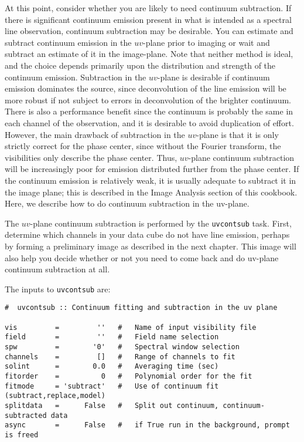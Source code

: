 At this point, consider whether you are likely to need continuum
subtraction.  If there is significant continuum emission present in
what is intended as a spectral line observation, continuum subtraction
may be desirable.  You can estimate and subtract continuum emission in
the $uv$-plane prior to imaging or wait and subtract an estimate of it
in the image-plane.  Note that neither method is ideal, and the choice
depends primarily upon the distribution and strength of the continuum
emission.  Subtraction in the $uv$-plane is desirable if continuum
emission dominates the source, since deconvolution of the line
emission will be more robust if not subject to errors in deconvolution
of the brighter continuum.  There is also a performance benefit since
the continuum is probably the same in each channel of the observation,
and it is desirable to avoid duplication of effort.  However, the main
drawback of subtraction in the $uv$-plane is that it is only strictly
correct for the phase center, since without the Fourier transform, the
visibilities only describe the phase center.  Thus, $uv$-plane continuum
subtraction will be increasingly poor for emission distributed further
from the phase center.  If the continuum emission is relatively weak,
it is usually adequate to subtract it in the image plane; this is
described in the Image Analysis section of this cookbook.  Here, we
describe how to do continuum subtraction in the uv-plane.

The $uv$-plane continuum subtraction is performed by the {\tt uvcontsub} task.
First, determine which channels in your data cube do not have line
emission, perhaps by forming a preliminary image as described in the
next chapter.  This image will also help you decide whether or not you
need to come back and do uv-plane continuum subtraction at all.

The inputs to {\tt uvcontsub} are:
\small
\begin{verbatim}
#  uvcontsub :: Continuum fitting and subtraction in the uv plane

vis         =         ''   #   Name of input visibility file
field       =         ''   #   Field name selection
spw         =        '0'   #   Spectral window selection
channels    =         []   #   Range of channels to fit
solint      =        0.0   #   Averaging time (sec)
fitorder    =          0   #   Polynomial order for the fit
fitmode     = 'subtract'   #   Use of continuum fit (subtract,replace,model)
splitdata   =      False   #   Split out continuum, continuum-subtracted data
async       =      False   #   if True run in the background, prompt is freed
\end{verbatim}
\normalsize

